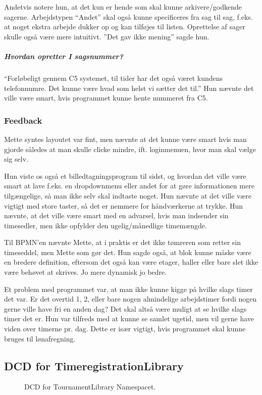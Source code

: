 Andetvis notere hun, at det kun er hende som skal kunne arkivere/godkende sagerne.
Arbejdstypen “Andet” skal også kunne specificeres fra sag til sag, f.eks. at noget ekstra arbejde dukker op og kan tilføjes til listen.
Oprettelse af sager skulle også være mere intuitivt. ”Det gav ikke mening” sagde hun.

\subparagraph{Hvordan opretter I sagsnummer?}
“Forløbeligt gennem C5 systemet, til tider har det også været kundens telefonnumre.
Det kunne være hvad som helst vi sætter det til.”
Hun nævnte det ville være smart, hvis programmet kunne hente nummeret fra C5.

\subsubsection{Feedback}
Mette syntes layoutet var fint, men nævnte at det kunne være smart hvis man gjorde således at man skulle clicke mindre, ift. loginmenuen, hvor man skal vælge sig selv.

Hun viste os også et billedtagningsprogram til sidst, og hvordan det ville være smart at lave f.eks. en dropdownmenu eller andet for at gøre informationen mere tilgængelige, så man ikke selv skal indtaste noget.
Hun nævnte at det ville være vigtigt med store taster, så det er nemmere for håndværkerne at trykke.
Hun nævnte, at det ville være smart med en advarsel, hvis man indsender sin timesedler, men ikke opfylder den ugelig/månedlige timemængde.

Til BPMN’en nævnte Mette, at i praktis er det ikke tømreren som retter sin timeseddel, men Mette som gør det.
Hun sagde også, at blok kunne måske være en bredere definition, eftersom det også kan være etager, haller eller bare slet ikke være behøvet at skrives.
Jo mere dynamisk jo bedre.

Et problem med programmet var, at man ikke kunne kigge på hvilke slags timer det var.
Er det overtid 1, 2, eller bare nogen almindelige arbejdstimer fordi nogen gerne ville have fri en anden dag?
Det skal altså være muligt at se hvilke slags timer det er.
Hun var tilfreds med at kunne se samlet ugetid, men vil gerne have viden over timerne pr. dag.
Dette er især vigtigt, hvis programmet skal kunne bruges til lønafregning.

\subsection{DCD for TimeregistrationLibrary}
\begin{figure}[H]
    \caption{DCD for TournamentLibrary Namespacet.}
    \label{fig:DCDLib}
\end{figure}